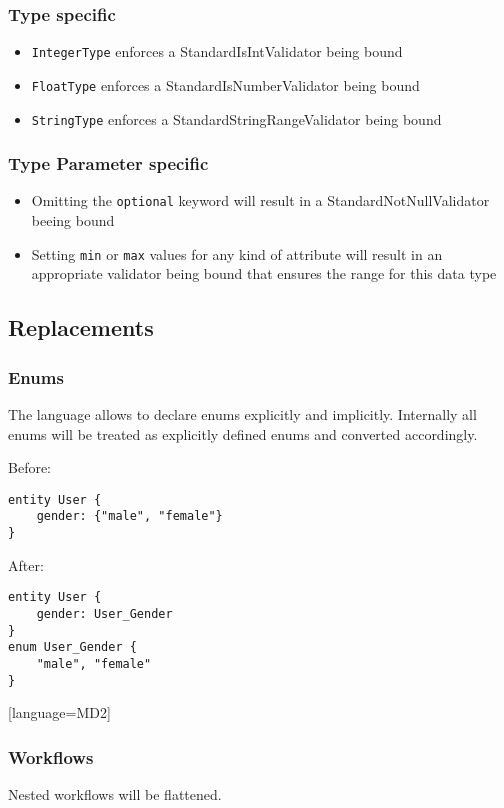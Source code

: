 \subsubsection{Type specific}
\begin{itemize}
\item \lstinline!IntegerType! enforces a StandardIsIntValidator being bound
\item \lstinline!FloatType! enforces a StandardIsNumberValidator being bound
\item \lstinline!StringType! enforces a StandardStringRangeValidator being bound
\end{itemize}

\subsubsection{Type Parameter specific}

\begin{itemize}
\item Omitting the \lstinline!optional! keyword will result in a StandardNotNullValidator beeing bound
\item Setting \lstinline!min! or \lstinline!max! values for any kind of attribute will result in an appropriate validator being bound that ensures the range for this data type
\end{itemize}

\subsection{Replacements}
\subsubsection{Enums}
The \MD language allows to declare enums explicitly and implicitly. Internally all enums will be treated as explicitly defined enums and converted accordingly.

Before:

\begin{lstlisting}[language=MD2]
entity User {
	gender: {"male", "female"}
}
\end{lstlisting}

After:

\begin{lstlisting}[language=MD2]
entity User {
	gender: User_Gender
}
enum User_Gender {
	"male", "female"
}
\end{lstlisting}[language=MD2]

\subsubsection{Workflows}
Nested workflows will be flattened.

